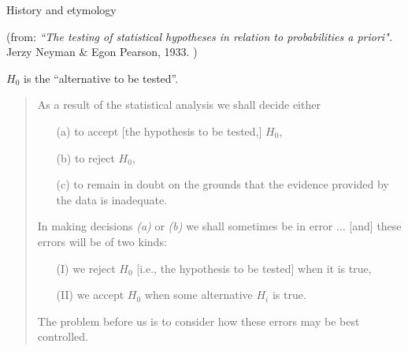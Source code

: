 \begin{frame}{History and etymology}

  (from: \textit{``The testing of statistical hypotheses in relation to probabilities a priori".} Jerzy Neyman \& Egon Pearson, 1933. )

    \vspace{2em}

  $H_0$ is the ``alternative to be tested''.
  \begin{quote}
    As a result of the statistical analysis we shall decide either
    \begin{itemize}
        \item[(a)] to accept [the hypothesis to be tested,] $H_0$, 
        \item[(b)] to reject $H_0$, 
        \item[(c)] to remain in doubt 
          on the grounds that the evidence provided by the data is inadequate.
    \end{itemize}
    In making decisions \textit{(a)} or \textit{(b)}
    we shall sometimes be in error
    ... [and] these errors will be of two kinds:
    \begin{itemize}
      \item[(I)] we reject $H_0$ [i.e., the hypothesis to be tested] when it is true,
      \item[(II)] we accept $H_0$ when some alternative $H_i$ is true.
    \end{itemize}
    The problem before us is to consider how these errors may be best controlled.
  \end{quote}


\end{frame}


